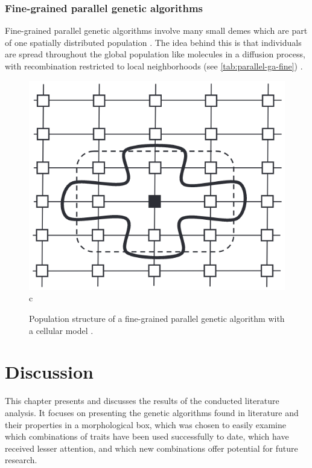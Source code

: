 \documentclass[sigconf]{acmart}
\begin{document}
\subsubsection{Fine-grained parallel genetic algorithms}
Fine-grained parallel genetic algorithms involve many small demes which are
part of one spatially distributed population \cite{Affenzeller2009}.
The idea behind this is that individuals are spread throughout the
global population like molecules in a diffusion process, with recombination
restricted to local neighborhoods (see \autoref{tab:parallel-ga-fine})
\cite{Affenzeller2009}.
\begin{figure}[h]
  \includegraphics[scale=0.24]{assets/parallel-ga-fine.png}c
  \caption{
    Population structure of a fine-grained parallel genetic algorithm
    with a cellular model \cite{Affenzeller2009}.
  }
  \label{tab:parallel-ga-fine}
\end{figure}


\section{Discussion}
This chapter presents and discusses the results of the conducted literature
analysis. It focuses on presenting the genetic algorithms found in literature
and their properties in a morphological box, which was chosen to easily
examine which combinations of traits have been used successfully to date,
which have received lesser attention, and which new combinations offer potential
for future research.
\end{document}
